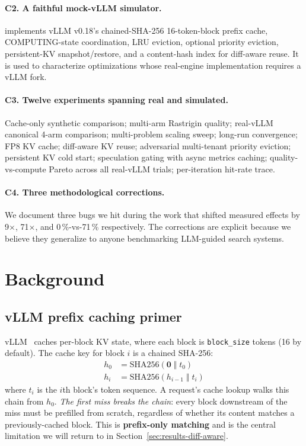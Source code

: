 \documentclass[11pt]{article}
\begin{document}
\paragraph{C2. A faithful mock-vLLM simulator.}
 implements vLLM v0.18's chained-SHA-256
16-token-block prefix cache, COMPUTING-state coordination, LRU
eviction, optional priority eviction, persistent-KV
snapshot/restore, and a content-hash index for diff-aware reuse. It
is used to characterize optimizations whose real-engine
implementation requires a vLLM fork.

\paragraph{C3. Twelve experiments spanning real and simulated.}
Cache-only synthetic comparison; multi-arm Rastrigin quality;
real-vLLM canonical 4-arm comparison; multi-problem scaling
sweep; long-run convergence; FP8 KV cache; diff-aware KV reuse;
adversarial multi-tenant priority eviction; persistent KV cold
start; speculation gating with async metrics caching;
quality-vs-compute Pareto across all real-vLLM trials; per-iteration
hit-rate trace.

\paragraph{C4. Three methodological corrections.}
We document three bugs we hit during the work that shifted measured
effects by 9$\times$, 71$\times$, and 0\,\%-vs-71\,\% respectively. The
corrections are explicit because we believe they generalize to anyone
benchmarking LLM-guided search systems.

\section{Background}
\label{sec:background}

\subsection{vLLM prefix caching primer}

vLLM~\cite{vllm2023} caches per-block KV state, where each block is
\verb|block_size| tokens (16 by default). The cache key for block $i$
is a chained SHA-256:
\begin{align*}
  h_0 &= \mathrm{SHA256}(\mathbf{0}\;\Vert\;t_0) \\
  h_i &= \mathrm{SHA256}(h_{i-1}\;\Vert\;t_i)
\end{align*}
where $t_i$ is the $i$th block's token sequence. A request's cache
lookup walks this chain from $h_0$. \emph{The first miss breaks the
chain}: every block downstream of the miss must be prefilled from
scratch, regardless of whether its content matches a previously-cached
block. This is \textbf{prefix-only matching} and is the central
limitation we will return to in
Section~\ref{sec:results-diff-aware}.
\end{document}
